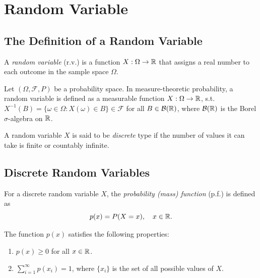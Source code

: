 \chapter{Random Variable}

\section{The Definition of a Random Variable}

\begin{definition}
  A \emph{random variable} (r.v.) is a function \(X: \Omega \to \mathbb{R}\) that assigns a real number to each outcome in the sample space \(\Omega\).
\end{definition}

\begin{remark}
  Let \((\Omega, \mathcal{F}, P)\) be a probability space. In measure-theoretic probability, a random variable is defined as a measurable function \(X: \Omega \to \mathbb{R}\), s.t. \(X^{-1}(B) = \{\omega \in \Omega : X(\omega) \in B\} \in \mathcal{F}\) for all \(B \in \mathcal{B}(\mathbb{R})\), where \(\mathcal{B}(\mathbb{R})\) is the Borel \(\sigma\)-algebra on \(\mathbb{R}\).
\end{remark}

\begin{definition}
  A random variable \(X\) is said to be \emph{discrete} type if the number of values it can take is finite or countably infinite.
\end{definition}

\section{Discrete Random Variables}

\begin{definition}
  For a discrete random variable \(X\), the \emph{probability (mass) function} (p.f.) is defined as
  \[
    p(x) = P(X = x), \quad x \in \mathbb{R}.
  \]
\end{definition}

\begin{proposition}
  The function \(p(x)\) satisfies the following properties:
  \begin{enumerate}
    \item \(p(x) \geq 0\) for all \(x \in \mathbb{R}\).
    \item \(\sum_{i = 1}^\infty p(x_i) = 1\), where \(\{x_i\}\) is the set of all possible values of \(X\).
  \end{enumerate}
\end{proposition}

